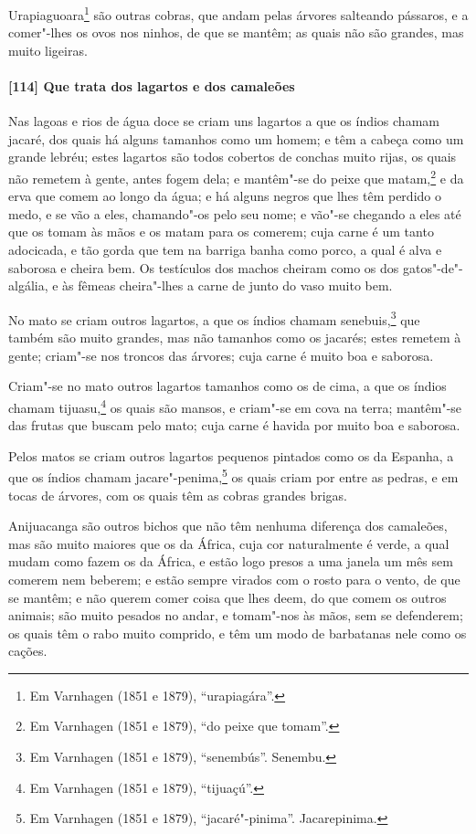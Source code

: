 Urapiaguoara\footnote{ Em Varnhagen (1851 e 1879), ``urapiagára''.} são outras cobras, que
andam pelas árvores salteando pássaros, e a comer"-lhes os ovos nos ninhos, de que se
mantêm; as quais não são grandes, mas muito ligeiras.

\paragraph{[114] Que trata dos lagartos e dos camaleões}\quad
Nas lagoas e rios de água doce se criam uns lagartos a que os índios chamam jacaré, dos
quais há alguns tamanhos como um homem; e têm a cabeça como um grande lebréu; estes
lagartos são todos cobertos de conchas muito rijas, os quais não remetem à gente, antes
fogem dela; e mantêm"-se do peixe que matam,\footnote{ Em Varnhagen (1851 e 1879), ``do
peixe que tomam''.} e da erva que comem ao longo da água; e há alguns negros que lhes têm
perdido o medo, e se vão a eles, chamando"-os pelo seu nome; e vão"-se chegando a eles até
que os tomam às mãos e os matam para os comerem; cuja carne é um tanto adocicada, e tão
gorda que tem na barriga banha como porco, a qual é alva e saborosa e cheira bem. Os
testículos dos machos cheiram como os dos gatos"-de"-algália, e às fêmeas cheira"-lhes a
carne de junto do vaso muito bem.

No mato se criam outros lagartos, a que os índios chamam senebuis,\footnote{ Em Varnhagen
(1851 e 1879), ``senembús''. Senembu.} que também são muito grandes, mas não tamanhos
como os jacarés; estes remetem à gente; criam"-se nos troncos das árvores; cuja carne é
muito boa e saborosa.

Criam"-se no mato outros lagartos tamanhos como os de cima, a que os índios chamam
tijuasu,\footnote{ Em Varnhagen (1851 e 1879), ``tijuaçú''.} os quais são mansos, e
criam"-se em cova na terra; mantêm"-se das frutas que buscam pelo mato; cuja carne é havida
por muito boa e saborosa.

Pelos matos se criam outros lagartos pequenos pintados como os da Espanha, a que os índios
chamam jacare"-penima,\footnote{ Em Varnhagen (1851 e 1879), ``jacaré"-pinima''.
Jacarepinima.} os quais criam por entre as pedras, e em tocas de árvores, com os quais
têm as cobras grandes brigas.

Anijuacanga são outros bichos que não têm nenhuma diferença dos camaleões, mas são muito
maiores que os da África, cuja cor naturalmente é verde, a qual mudam como fazem os da
África, e estão logo presos a uma janela um mês sem comerem nem beberem; e estão sempre
virados com o rosto para o vento, de que se mantêm; e não querem comer coisa que lhes
deem, do que comem os outros animais; são muito pesados no andar, e tomam"-nos às mãos, sem
se defenderem; os quais têm o rabo muito comprido, e têm um modo de barbatanas nele como
os cações.


